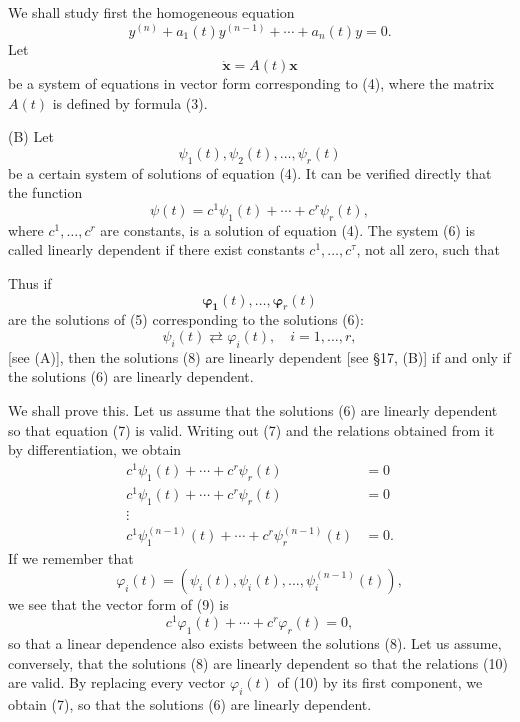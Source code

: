 \documentclass[10pt,a5paper]{book}
\theoremstyle{plain}
\theoremstyle{definition}
\theoremstyle{remark}
\begin{document}
We shall study first the homogeneous equation
\begin{equation*}
y^{(n)}+a_{1}(t) y^{(n-1)}+\cdots+a_{n}(t) y=0 . \tag{4}
\end{equation*}
Let
\begin{equation*}
\dot{\mathbf{x}}=A(t) \mathbf{x} \tag{5}
\end{equation*}
be a system of equations in vector form corresponding to (4), where the matrix $A(t)$ is defined by formula (3).

(B) Let
\begin{equation*}
\psi_{1}(t), \psi_{2}(t), \ldots, \psi_{r}(t) \tag{6}
\end{equation*}
be a certain system of solutions of equation (4). It can be verified directly that the function
\[
\psi(t)=c^{1} \psi_{1}(t)+\cdots+c^{r} \psi_{r}(t),
\]
where $c^{1}, \ldots, c^{r}$ are constants, is a solution of equation (4). The system (6) is called linearly dependent if there exist constants $c^{1}, \ldots, c^{\tau}$, not all zero, such that

Thus if
\begin{equation*}
\boldsymbol{\varphi}_{\mathbf{1}}(t), \ldots, \boldsymbol{\varphi}_{r}(t) \tag{8}
\end{equation*}
are the solutions of (5) corresponding to the solutions (6):
\[
\psi_{i}(t) \rightleftarrows \varphi_{i}(t), \quad i=1, \ldots, r,
\]
[see (A)], then the solutions (8) are linearly dependent [see §17, (B)] if and only if the solutions (6) are linearly dependent.

We shall prove this. Let us assume that the solutions (6) are linearly dependent so that equation (7) is valid. Writing out (7) and the relations obtained from it by differentiation, we obtain
\[
\begin{array}{cc}
c^{1} \psi_{1}(t)+\cdots+c^{r} \psi_{r}(t) & =0 \\
c^{1} \psi_{1}(t)+\cdots+c^{r} \psi_{r}(t) & =0  \tag{9}\\
\vdots & \\
c^{1} \psi_{1}^{(n-1)}(t)+\cdots+c^{r} \psi_{r}^{(n-1)}(t) & =0 .
\end{array}
\]
If we remember that
\[
\varphi_{i}(t)=\left(\psi_{i}(t), \psi_{i}(t), \ldots, \psi_{i}^{(n-1)}(t)\right),
\]
we see that the vector form of (9) is
\begin{equation*}
c^{1} \varphi_{1}(t)+\cdots+c^{r} \varphi_{r}(t)=0, \tag{10}
\end{equation*}
so that a linear dependence also exists between the solutions (8). Let us assume, conversely, that the solutions (8) are linearly dependent so that the relations (10) are valid. By replacing every vector $\varphi_{i}(t)$ of (10) by its first component, we obtain (7), so that the solutions (6) are linearly dependent.
\end{document}
